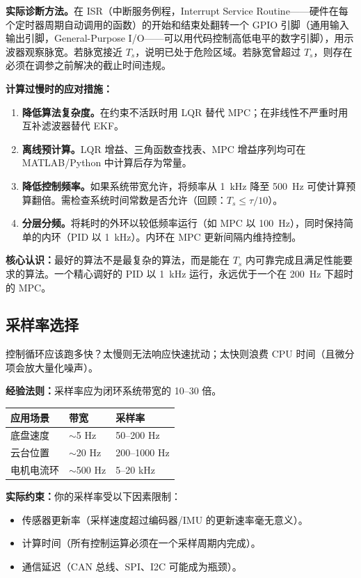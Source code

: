 \begin{mdframed}[linewidth=1pt, innertopmargin=10pt, innerbottommargin=10pt]
\textbf{实际诊断方法。}在 ISR（中断服务例程，Interrupt Service Routine——硬件在每个定时器周期自动调用的函数）的开始和结束处翻转一个 GPIO 引脚（通用输入输出引脚，General-Purpose I/O——可以用代码控制高低电平的数字引脚），用示波器观察脉宽。若脉宽接近 $T_s$，说明已处于危险区域。若脉宽曾超过 $T_s$，则存在必须在调参之前解决的截止时间违规。

\textbf{计算过慢时的应对措施：}
\begin{enumerate}[nosep]
    \item \textbf{降低算法复杂度。}在约束不活跃时用 LQR 替代 MPC；在非线性不严重时用互补滤波器替代 EKF。
    \item \textbf{离线预计算。}LQR 增益、三角函数查找表、MPC 增益序列均可在 MATLAB/Python 中计算后存为常量。
    \item \textbf{降低控制频率。}如果系统带宽允许，将频率从 1~kHz 降至 500~Hz 可使计算预算翻倍。需检查系统时间常数是否允许（回顾：$T_s \leq \tau / 10$）。
    \item \textbf{分层分频。}将耗时的外环以较低频率运行（如 MPC 以 100~Hz），同时保持简单的内环（PID 以 1~kHz）。内环在 MPC 更新间隔内维持控制。
\end{enumerate}

\textbf{核心认识：}最好的算法不是最复杂的算法，而是能在 $T_s$ 内可靠完成且满足性能要求的算法。一个精心调好的 PID 以 1~kHz 运行，永远优于一个在 200~Hz 下超时的 MPC。
\end{mdframed}

\subsection{采样率选择}

控制循环应该跑多快？太慢则无法响应快速扰动；太快则浪费 CPU 时间（且微分项会放大量化噪声）。

\textbf{经验法则：}采样率应为闭环系统带宽的 10--30 倍。

\begin{center}
\begin{tabular}{lll}
\toprule
\textbf{应用场景} & \textbf{带宽} & \textbf{采样率} \\
\midrule
底盘速度 & $\sim$5 Hz & 50--200 Hz \\
云台位置 & $\sim$20 Hz & 200--1000 Hz \\
电机电流环 & $\sim$500 Hz & 5--20 kHz \\
\bottomrule
\end{tabular}
\end{center}

\textbf{实际约束：}你的采样率受以下因素限制：
\begin{itemize}
    \item 传感器更新率（采样速度超过编码器/IMU 的更新速率毫无意义）。
    \item 计算时间（所有控制运算必须在一个采样周期内完成）。
    \item 通信延迟（CAN 总线、SPI、I2C 可能成为瓶颈）。
\end{itemize}

